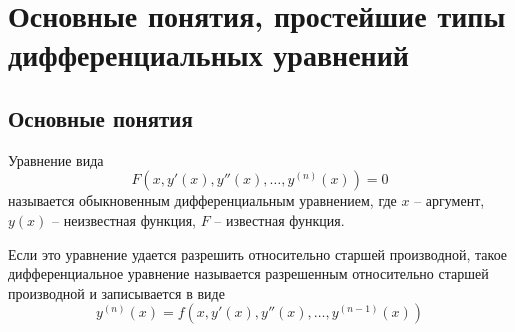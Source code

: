 



    \section{Основные понятия, простейшие типы дифференциальных уравнений}
    \subsection{Основные понятия}

    \begin{definition} 
        Уравнение вида \[F(x, y'(x), y''(x), \dots, y^{(n)}(x)) = 0\] называется обыкновенным дифференциальным уравнением,
        где $x$ -- аргумент, $y(x)$ -- неизвестная функция, $F$ -- известная функция.
    \end{definition}

    \begin{definition}
        Если это уравнение удается разрешить относительно старшей производной, такое дифференциальное
        уравнение называется разрешенным относительно старшей производной и записывается в виде 
        \[y^{(n)}(x) = f(x, y'(x), y''(x), \dots, y^{(n-1)}(x))\]
    \end{definition}
    

